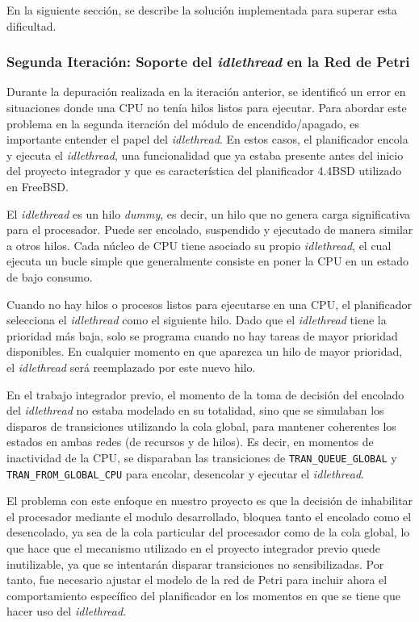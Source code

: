 En la siguiente sección, se describe la solución implementada para superar esta dificultad.

\subsubsection{Segunda Iteración: Soporte del \textit{idlethread} en la Red de Petri}
\label{ch:idlethread}

Durante la depuración realizada en la iteración anterior, se identificó un error en situaciones donde una CPU no tenía hilos listos para ejecutar. Para abordar este problema en la segunda iteración del módulo de encendido/apagado, es importante entender el papel del \textit{idlethread}. En estos casos, el planificador encola y ejecuta el \textit{idlethread}, una funcionalidad que ya estaba presente antes del inicio del proyecto integrador y que es característica del planificador 4.4BSD utilizado en FreeBSD.\par

El \textit{idlethread} es un hilo \textit{dummy}, es decir, un hilo que no genera carga significativa para el procesador. Puede ser encolado, suspendido y ejecutado de manera similar a otros hilos. Cada núcleo de CPU tiene asociado su propio \textit{idlethread}, el cual ejecuta un bucle simple que generalmente consiste en poner la CPU en un estado de bajo consumo.

Cuando no hay hilos o procesos listos para ejecutarse en una CPU, el planificador selecciona el \textit{idlethread} como el siguiente hilo. Dado que el \textit{idlethread} tiene la prioridad más baja, solo se programa cuando no hay tareas de mayor prioridad disponibles. En cualquier momento en que aparezca un hilo de mayor prioridad, el \textit{idlethread} será reemplazado por este nuevo hilo.

En el trabajo integrador previo, el momento de la toma de decisión del encolado del \textit{idlethread} no estaba modelado en su totalidad, sino que se simulaban los disparos de transiciones utilizando la cola global, para mantener coherentes los estados en ambas redes (de recursos y de hilos). Es decir, en momentos de inactividad de la CPU, se disparaban las transiciones de \texttt{TRAN\_QUEUE\_GLOBAL} y \texttt{TRAN\_FROM\_GLOBAL\_CPU} para encolar, desencolar y ejecutar el \textit{idlethread}.

El problema con este enfoque en nuestro proyecto es que la decisión de inhabilitar el procesador mediante el modulo desarrollado, bloquea tanto el encolado como el desencolado, ya sea de la cola particular del procesador como de la cola global, lo que hace que el mecanismo utilizado en el proyecto integrador previo quede inutilizable, ya que se intentarán disparar transiciones no sensibilizadas. Por tanto, fue necesario ajustar el modelo de la red de Petri para incluir ahora el comportamiento específico del planificador en los momentos en que se tiene que hacer uso del \textit{idlethread}.

